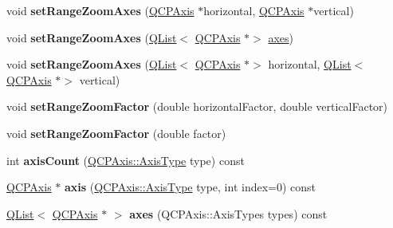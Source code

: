 \begin{DoxyCompactItemize}
\item 
\mbox{\label{class_q_c_p_axis_rect_a9442cca2aa358405f39a64d51eca13d2}} 
void {\bfseries set\+Range\+Zoom\+Axes} (\hyperlink{class_q_c_p_axis}{Q\+C\+P\+Axis} $\ast$horizontal, \hyperlink{class_q_c_p_axis}{Q\+C\+P\+Axis} $\ast$vertical)
\item 
\mbox{\label{class_q_c_p_axis_rect_a07a41be4eda0d42abe49475e9fa38b92}} 
void {\bfseries set\+Range\+Zoom\+Axes} (\hyperlink{class_q_list}{Q\+List}$<$ \hyperlink{class_q_c_p_axis}{Q\+C\+P\+Axis} $\ast$$>$ \hyperlink{class_q_c_p_axis_rect_a8db4722cb93e9c4a6f0d91150c200867}{axes})
\item 
\mbox{\label{class_q_c_p_axis_rect_ae85a63a856e111def77437812c3acc99}} 
void {\bfseries set\+Range\+Zoom\+Axes} (\hyperlink{class_q_list}{Q\+List}$<$ \hyperlink{class_q_c_p_axis}{Q\+C\+P\+Axis} $\ast$$>$ horizontal, \hyperlink{class_q_list}{Q\+List}$<$ \hyperlink{class_q_c_p_axis}{Q\+C\+P\+Axis} $\ast$$>$ vertical)
\item 
\mbox{\label{class_q_c_p_axis_rect_a895d7ac745ea614e04056244b3c138ac}} 
void {\bfseries set\+Range\+Zoom\+Factor} (double horizontal\+Factor, double vertical\+Factor)
\item 
\mbox{\label{class_q_c_p_axis_rect_ae83d187b03fc6fa4f00765ad50cd3fc3}} 
void {\bfseries set\+Range\+Zoom\+Factor} (double factor)
\item 
\mbox{\label{class_q_c_p_axis_rect_a85b321acec0f694d8b5fdeafdbff3133}} 
int {\bfseries axis\+Count} (\hyperlink{class_q_c_p_axis_ae2bcc1728b382f10f064612b368bc18a}{Q\+C\+P\+Axis\+::\+Axis\+Type} type) const
\item 
\mbox{\label{class_q_c_p_axis_rect_a9a9849e911447d3d6a4665de89957606}} 
\hyperlink{class_q_c_p_axis}{Q\+C\+P\+Axis} $\ast$ {\bfseries axis} (\hyperlink{class_q_c_p_axis_ae2bcc1728b382f10f064612b368bc18a}{Q\+C\+P\+Axis\+::\+Axis\+Type} type, int index=0) const
\item 
\mbox{\label{class_q_c_p_axis_rect_aabcfd70a8aab0532783ab79fb095a464}} 
\hyperlink{class_q_list}{Q\+List}$<$ \hyperlink{class_q_c_p_axis}{Q\+C\+P\+Axis} $\ast$ $>$ {\bfseries axes} (Q\+C\+P\+Axis\+::\+Axis\+Types types) const
$$
\end{DoxyCompactItemize}
